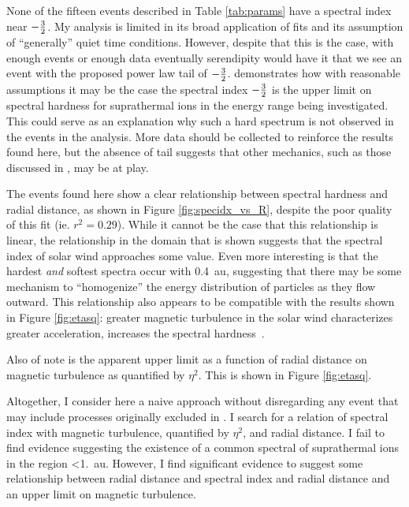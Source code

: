 \documentclass[letterpaper,11pt]{article}
\begin{document}
None of the fifteen events described in Table \ref{tab:params} have a spectral index near $-{3 \over 2}$.  My analysis is limited in its broad application of fits and its assumption of ``generally'' quiet time conditions.  However, despite that this is the case, with enough events or enough data eventually serendipity would have it that we see an event with the proposed power law tail of $-{3 \over 2}$.  \citet{Schwadron2019AGU} demonstrates how with reasonable assumptions it may be the case the spectral index $-{3 \over 2}$ is the upper limit on spectral hardness for suprathermal ions in the energy range being investigated.  This could serve as an explanation why such a hard spectrum is not observed in the events in the analysis.  More data should be collected to reinforce the results found here, but the absence of tail suggests that other mechanics, such as those discussed in \citet{Schwadron2019AGU}, may be at play.

The events found here show a clear relationship between spectral hardness and radial distance, as shown in Figure \ref{fig:specidx_vs_R}, despite the poor quality of this fit (ie. $r^2 = 0.29$).  While it cannot be the case that this relationship is linear, the relationship in the domain that is shown suggests that the spectral index of solar wind approaches some value.  Even more interesting is that the hardest \textit{and} softest spectra occur with \SI{0.4}{\astronomicalunit}, suggesting that there may be some mechanism to ``homogenize'' the energy distribution of particles as they flow outward.  This relationship also appears to be compatible with the results shown in Figure \ref{fig:etasq}: greater magnetic turbulence in the solar wind characterizes greater acceleration, increases the spectral hardness~\citep{Fisk2008}.

Also of note is the apparent upper limit as a function of radial distance on magnetic turbulence as quantified by $\eta^2$.  This is shown in Figure \ref{fig:etasq}.

Altogether, I consider here a naive approach without disregarding any event that may include processes originally excluded in \citet{Fisk2008}.  I search for a relation of spectral index with magnetic turbulence, quantified by $\eta^2$, and radial distance.  I fail to find evidence suggesting the existence of a common spectral of suprathermal ions in the region \SI{<1.}{\astronomicalunit}.  However, I find significant evidence to suggest some relationship between radial distance and spectral index and radial distance and an upper limit on magnetic turbulence.
\end{document}
